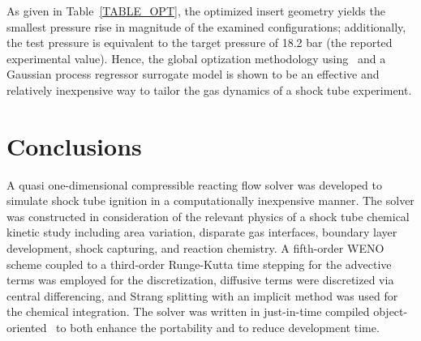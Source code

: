 As given in Table~\ref{TABLE_OPT}, the optimized insert geometry yields the smallest pressure rise in magnitude of the examined configurations; additionally, the test pressure is equivalent to the target pressure of 18.2 bar (the reported experimental value). Hence, the global optization methodology using \stnshk\ and a Gaussian process regressor surrogate model is shown to be an effective and relatively inexpensive way to tailor the gas dynamics of a shock tube experiment.

\begin{table}[!t!]
	\centering
	\footnotesize
	\caption{\label{TABLE_OPT} Summary table of the configurations for the \stnshk\ driver insert runs. Experimental and simulated pressure rises computed according to Eq.~\ref{EQ_PR}. The shock tube geometry matches that reported by Hong~\emph{et al.}~\cite{HONG_PANG_VASU_DAVIDSON_HANSON_SW2009} for the high pressure shock tube.}
\end{table}
\section{Conclusions}
A quasi one-dimensional compressible reacting flow solver was developed to simulate shock tube ignition in a computationally inexpensive manner. The solver was constructed in consideration of the relevant physics of a shock tube chemical kinetic study including area variation, disparate gas interfaces, boundary layer development, shock capturing, and reaction chemistry. A fifth-order WENO scheme coupled to a third-order Runge-Kutta time stepping for the advective terms was employed for the discretization, diffusive terms were discretized via central differencing, and Strang splitting with an implicit method was used for the chemical integration. The solver was written in just-in-time compiled object-oriented \python\ to both enhance the portability and to reduce development time. 

